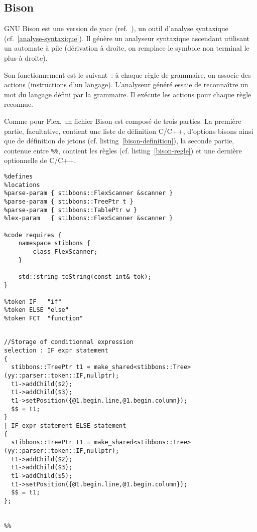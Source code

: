 \subsection{Bison}

GNU Bison est une version de yacc (ref.~\cite{bison}), un outil d'analyse syntaxique (cf.~\ref{analyse-syntaxique}). Il génère un analyseur syntaxique ascendant utilisant un automate à pile (dérivation à droite, on remplace le symbole non terminal le plus à droite).

Son fonctionnement est le suivant~: à chaque règle de grammaire, on associe des actions (instructions d'un langage). L'analyseur généré essaie de reconnaître un mot du langage défini par la grammaire. Il exécute les actions pour chaque règle reconnue.

Comme pour Flex, un fichier Bison est composé de trois parties. La première partie, facultative, contient une liste de définition C/C++, d'options bisons ainsi que de définition de jetons (cf. listing~\ref{bison-definition}), la seconde partie, contenue entre \verb|%%|, contient les règles (cf. listing~\ref{bison-regle}) et une dernière optionnelle de C/C++.

\begin{lstlisting}[label=bison-definition,caption=Definition C++ en bison]
%skeleton "lalr1.cc"
%defines
%locations
%parse-param { stibbons::FlexScanner &scanner }
%parse-param { stibbons::TreePtr t }
%parse-param { stibbons::TablePtr w }
%lex-param   { stibbons::FlexScanner &scanner }

%code requires {
	namespace stibbons {
		class FlexScanner;
	}

	std::string toString(const int& tok);
}

%token IF   "if"
%token ELSE "else"
%token FCT  "function"
\end{lstlisting}

\begin{lstlisting}[label=bison-regle,caption=Règles de grammaire en bison]
%%

//Storage of conditionnal expression
selection : IF expr statement
{
  stibbons::TreePtr t1 = make_shared<stibbons::Tree>(yy::parser::token::IF,nullptr);
  t1->addChild($2);
  t1->addChild($3);
  t1->setPosition({@1.begin.line,@1.begin.column});
  $$ = t1;
}
| IF expr statement ELSE statement
{
  stibbons::TreePtr t1 = make_shared<stibbons::Tree>(yy::parser::token::IF,nullptr);
  t1->addChild($2);
  t1->addChild($3);
  t1->addChild($5);
  t1->setPosition({@1.begin.line,@1.begin.column});
  $$ = t1;
};


%%
\end{lstlisting}

